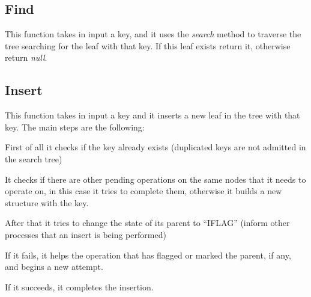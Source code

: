 \documentclass[a4paper]{article}
\begin{document}
\subsection{Find}
This function takes in input a key, and it uses the \emph{search} method to traverse the tree searching for the leaf with that key. If this leaf exists return it, otherwise return \emph{null}.

\subsection{Insert}
This function takes in input a key and it inserts a new leaf in the tree with that key. The main steps are the following:
\begin{compactitem}
  \item First of all it checks if the key already exists (duplicated keys are not admitted in the search tree)
  \item It checks if there are other pending operations on the same nodes that it needs to operate on, in this case it tries to complete them, otherwise it builds a new structure with the key. 
  \item After that it tries to change the state of its parent to ``IFLAG'' (inform other processes that an insert is being performed)
  \begin{compactitem}
    \item If it fails, it helps the operation that has flagged or marked the parent, if any, and begins a new attempt.
    \item If it succeeds, it completes the insertion.
  \end{compactitem}
\end{compactitem}
\end{document}
